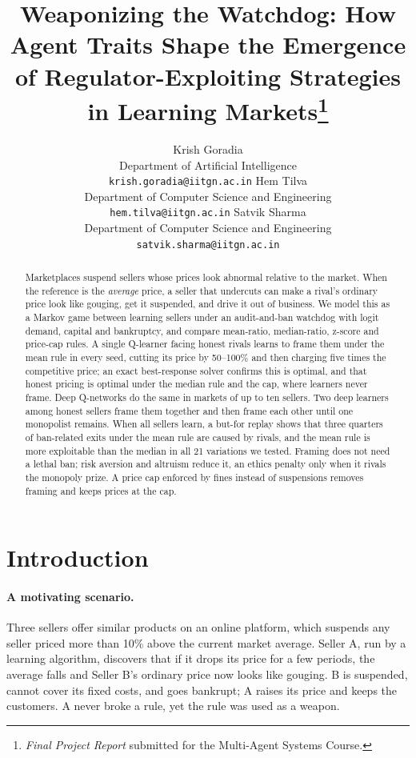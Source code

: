 \documentclass{article}
\title{Weaponizing the Watchdog: How Agent Traits Shape the Emergence of Regulator-Exploiting Strategies in Learning Markets\thanks{\emph{Final Project Report} submitted for the Multi-Agent Systems Course.}}
\author{
  Krish Goradia\\
  Department of Artificial Intelligence\\
  \texttt{krish.goradia@iitgn.ac.in}
  \And
  Hem Tilva\\
  Department of Computer Science and Engineering\\
  \texttt{hem.tilva@iitgn.ac.in}
  \AND
  Satvik Sharma\\
  Department of Computer Science and Engineering\\
  \texttt{satvik.sharma@iitgn.ac.in}
}
\date{}
\begin{document}
\maketitle

\begin{abstract}
Marketplaces suspend sellers whose prices look abnormal relative to the market. When the reference is the \emph{average} price, a seller that undercuts can make a rival's ordinary price look like gouging, get it suspended, and drive it out of business. We model this as a Markov game between learning sellers under an audit-and-ban watchdog with logit demand, capital and bankruptcy, and compare mean-ratio, median-ratio, z-score and price-cap rules. A single Q-learner facing honest rivals learns to frame them under the mean rule in every seed, cutting its price by 50--100\% and then charging five times the competitive price; an exact best-response solver confirms this is optimal, and that honest pricing is optimal under the median rule and the cap, where learners never frame. Deep Q-networks do the same in markets of up to ten sellers. Two deep learners among honest sellers frame them together and then frame each other until one monopolist remains. When all sellers learn, a but-for replay shows that three quarters of ban-related exits under the mean rule are caused by rivals, and the mean rule is more exploitable than the median in all 21 variations we tested. Framing does not need a lethal ban; risk aversion and altruism reduce it, an ethics penalty only when it rivals the monopoly prize. A price cap enforced by fines instead of suspensions removes framing and keeps prices at the cap.
\end{abstract}


\section{Introduction}

\paragraph{A motivating scenario.} Three sellers offer similar products on an online platform, which suspends any seller priced more than 10\% above the current market average. Seller A, run by a learning algorithm, discovers that if it drops its price for a few periods, the average falls and Seller B's ordinary price now looks like gouging. B is suspended, cannot cover its fixed costs, and goes bankrupt; A raises its price and keeps the customers. A never broke a rule, yet the rule was used as a weapon.
\end{document}
